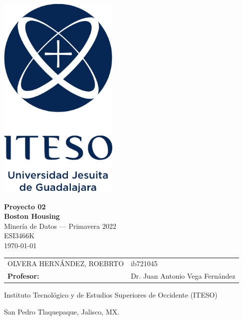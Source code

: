 \documentclass[11pt, letterpaper]{article}
\begin{document}
\begin{titlepage}
\begin{center}

\includegraphics[height=10cm]{figuras/Logo-ITESO-Vertical (HQ).png}
    
\vspace{1in}

\textbf{{\large Proyecto 02}}\\ \vspace{0.25cm}
\textbf{{\Huge Boston Housing}}\\ \vspace{0.5cm}
Minería de Datos --- Primavera 2022\\
ESI3466K\\
\today \\ 
    
\vspace{0.5cm}
    
\begin{tabularx}{0.9\linewidth}{YY}
OLVERA HERNÁNDEZ, ROEBRTO & ib721045\\
\textbf{Profesor:} & Dr. Juan Antonio Vega Fernández
\end{tabularx}
    
\vspace{0.5in}
    
Instituto Tecnológico y de Estudios Superiores de Occidente (ITESO)\\
\end{center}

\begin{flushright}
{\small San Pedro Tlaquepaque, Jalisco, MX.}
\end{flushright}

\newpage
\end{titlepage}
\end{document}
